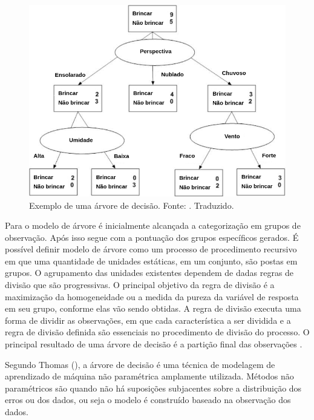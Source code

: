 \begin{figure}[H]
    \centering
    \includegraphics[scale=0.4]{figuras/referencial_teorico/arvore_decisao.png}
    \caption[Exemplo de uma árvore de decisão]{Exemplo de uma árvore de decisão. Fonte: \cite{Amal}. Traduzido.}
    \label{fig:arvore_decisao}
\end{figure}

Para o modelo de árvore é inicialmente alcançada a categorização em grupos de observação. Após isso segue com a pontuação dos grupos específicos gerados. É possível definir modelo de árvore como um processo de procedimento recursivo em que uma quantidade de unidades estáticas, em um conjunto, são postas em grupos. O agrupamento das unidades existentes dependem de dadas regras de divisão que são progressivas. O principal objetivo da regra de divisão é a maximização da homogeneidade ou a medida da pureza da variável de resposta em seu grupo, conforme elas vão sendo obtidas. A regra de divisão executa uma forma de dividir as observações, em que cada característica a ser dividida e a regra de divisão definida são essenciais no procedimento de divisão do processo. O principal resultado de uma árvore de decisão é a partição final das observações \cite{Amal}. 

Segundo Thomas (\citeyear{Thomas:2017}), a árvore de decisão é uma técnica de modelagem de aprendizado de máquina não paramétrica amplamente utilizada. Métodos não paramétricos são quando não há suposições subjacentes sobre a distribuição dos erros ou dos dados, ou seja o modelo é construído baseado na observação dos dados.

